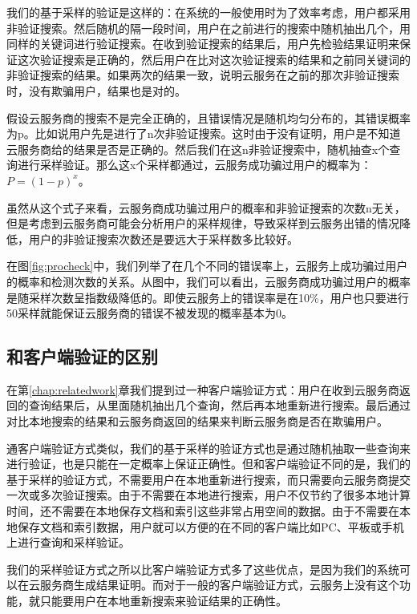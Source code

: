 我们的基于采样的验证是这样的：在系统的一般使用时为了效率考虑，用户都采用非验证搜索。然后随机的隔一段时间，用户在之前进行的搜索中随机抽出几个，用同样的关键词进行验证搜索。在收到验证搜索的结果后，用户先检验结果证明来保证这次验证搜索是正确的，然后用户在比对这次验证搜索的结果和之前同关键词的非验证搜索的结果。如果两次的结果一致，说明云服务在之前的那次非验证搜索时，没有欺骗用户，结果也是对的。

假设云服务商的搜索不是完全正确的，且错误情况是随机均匀分布的，其错误概率为p。比如说用户先是进行了n次非验证搜索。这时由于没有证明，用户是不知道云服务商给的结果是否是正确的。然后我们在这n非验证搜索中，随机抽查x个查询进行采样验证。那么这x个采样都通过，云服务成功骗过用户的概率为：$P = (1-p)^x$。

虽然从这个式子来看，云服务商成功骗过用户的概率和非验证搜索的次数n无关，但是考虑到云服务商可能会分析用户的采样规律，导致采样到云服务出错的情况降低，用户的非验证搜索次数还是要远大于采样数多比较好。

在图\ref{fig:procheck}中，我们列举了在几个不同的错误率上，云服务上成功骗过用户的概率和检测次数的关系。从图中，我们可以看出，云服务商成功骗过用户的概率是随采样次数呈指数级降低的。即使云服务上的错误率是在10\%，用户也只要进行50采样就能保证云服务商的错误不被发现的概率基本为0。

\subsection{和客户端验证的区别}
在第\ref{chap:relatedwork}章我们提到过一种客户端验证方式：用户在收到云服务商返回的查询结果后，从里面随机抽出几个查询，然后再本地重新进行搜索。最后通过对比本地搜索的结果和云服务商返回的结果来判断云服务商是否在欺骗用户。

通客户端验证方式类似，我们的基于采样的验证方式也是通过随机抽取一些查询来进行验证，也是只能在一定概率上保证正确性。但和客户端验证不同的是，我们的基于采样的验证方式，不需要用户在本地重新进行搜索，而只需要向云服务商提交一次或多次验证搜索。由于不需要在本地进行搜索，用户不仅节约了很多本地计算时间，还不需要在本地保存文档和索引这些非常占用空间的数据。由于不需要在本地保存文档和索引数据，用户就可以方便的在不同的客户端比如PC、平板或手机上进行查询和采样验证。

我们的采样验证方式之所以比客户端验证方式多了这些优点，是因为我们的系统可以在云服务商生成结果证明。而对于一般的客户端验证方式，云服务上没有这个功能，就只能要用户在本地重新搜索来验证结果的正确性。

